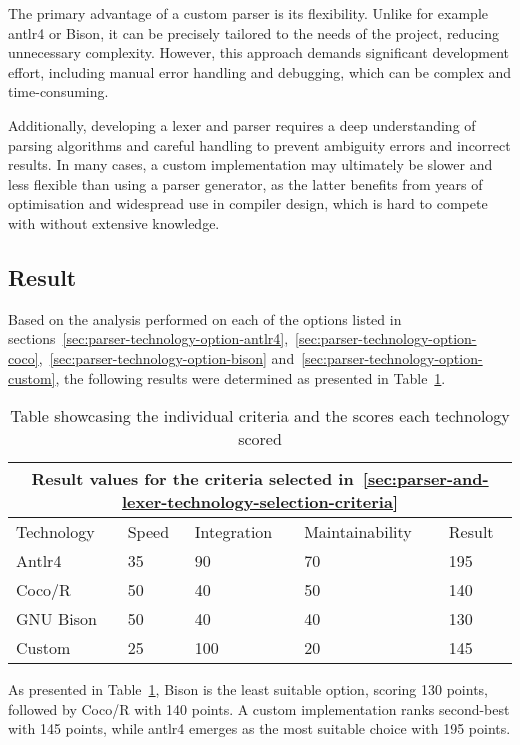 The primary advantage of a custom parser is its flexibility. Unlike for example \Gls{antlr4} or Bison, it can be precisely tailored to the needs of the project, reducing unnecessary complexity. However, this approach demands significant development effort, including manual error handling and debugging, which can be complex and time-consuming.

Additionally, developing a lexer and parser requires a deep understanding of parsing algorithms and careful handling to prevent ambiguity errors and incorrect results. In many cases, a custom implementation may ultimately be slower and less flexible than using a parser generator, as the latter benefits from years of optimisation and widespread use in compiler design, which is hard to compete with without extensive knowledge.

\subsection{Result}

Based on the analysis performed on each of the options listed in sections~\ref{sec:parser-technology-option-antlr4},~\ref{sec:parser-technology-option-coco},~\ref{sec:parser-technology-option-bison} and~\ref{sec:parser-technology-option-custom}, the following results were determined as presented in Table~\ref{tab:parser-and-lexer-technology-results}.

\begin{table}[H]
	\centering
	\begin{tabular}{ |p{3.2cm}|p{2.8cm}|p{2.8cm}|p{2.8cm}|p{1.6cm}|  }
		\hline
		\multicolumn{5}{|c|}{Result values for the criteria selected in~\ref{sec:parser-and-lexer-technology-selection-criteria}} \\
		\hline
		Technology&Speed&Integration&Maintainability&Result\\
		\hline
		Antlr4&35&90&70&195\\
		Coco/R&50&40&50&140\\
		GNU Bison&50&40&40&130\\
		Custom&25&100&20&145\\
		\hline
	\end{tabular}
	\caption{Table showcasing the individual criteria and the scores each technology scored}
	\label{tab:parser-and-lexer-technology-results}
\end{table}

As presented in Table~\ref{tab:parser-and-lexer-technology-results}, Bison is the least suitable option, scoring 130 points, followed by Coco/R with 140 points. A custom implementation ranks second-best with 145 points, while \Gls{antlr4} emerges as the most suitable choice with 195 points.

